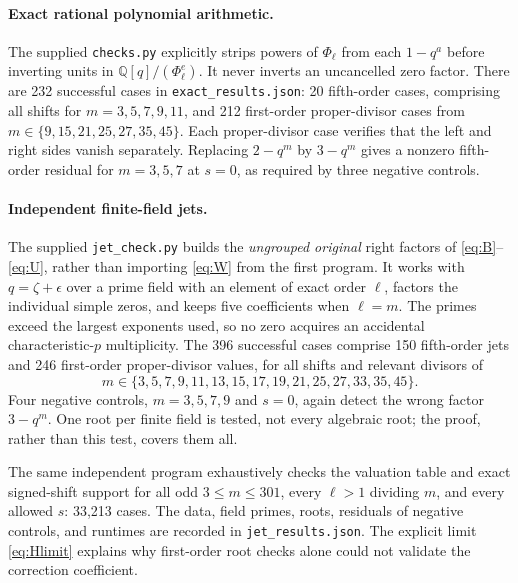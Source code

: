 \documentclass[11pt,a4paper]{article}
\newcommand{\ph}{\Phi}\newcommand{\ord}{\operatorname{ord}}
\begin{document}
\paragraph{Exact rational polynomial arithmetic.}
The supplied \texttt{checks.py} explicitly strips powers of $\ph_\ell$
from each $1-q^a$ before inverting units in
$\mathbb Q[q]/(\ph_\ell^e)$. It never inverts an uncancelled zero factor.
There are 232 successful cases in \texttt{exact\_results.json}:
20 fifth-order cases, comprising all shifts for $m=3,5,7,9,11$, and
212 first-order proper-divisor cases from
$m\in\{9,15,21,25,27,35,45\}$.
Each proper-divisor case verifies that the left and right sides vanish
separately. Replacing $2-q^m$ by $3-q^m$ gives a nonzero fifth-order
residual for $m=3,5,7$ at $s=0$, as required by three negative controls.

\paragraph{Independent finite-field jets.}
The supplied \texttt{jet\_check.py} builds the \emph{ungrouped original}
right factors of \eqref{eq:B}--\eqref{eq:U}, rather than importing
\eqref{eq:W} from the first program. It works with $q=\zeta+\epsilon$
over a prime field with an element of exact order $\ell$, factors the
individual simple zeros, and keeps five coefficients when $\ell=m$.
The primes exceed the largest exponents used, so no zero acquires an
accidental characteristic-$p$ multiplicity. The 396 successful cases
comprise 150 fifth-order jets and 246 first-order proper-divisor values,
for all shifts and relevant divisors of
\[
 m\in\{3,5,7,9,11,13,15,17,19,21,25,27,33,35,45\}.
\]
Four negative controls, $m=3,5,7,9$ and $s=0$, again detect the wrong
factor $3-q^m$. One root per finite field is tested, not every algebraic
root; the proof, rather than this test, covers them all.

The same independent program exhaustively checks the valuation table
and exact signed-shift support for all odd $3\leq m\leq301$, every
$\ell>1$ dividing $m$, and every allowed $s$: 33,213 cases.
The data, field primes, roots, residuals of negative controls, and
runtimes are recorded in \texttt{jet\_results.json}. The explicit limit
\eqref{eq:Hlimit} explains why first-order root checks alone could not
validate the correction coefficient.
\end{document}

